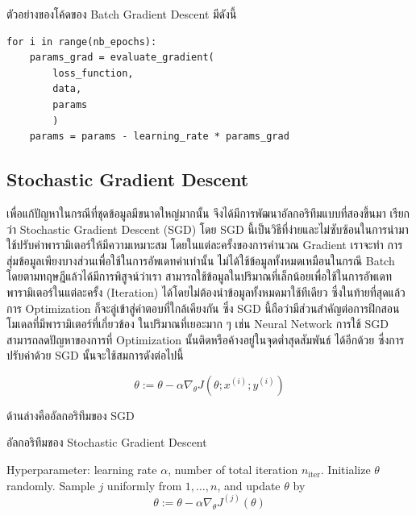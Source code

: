 \noindent ตัวอย่างของโค้ดของ Batch Gradient Descent มีดังนี้

\begin{lstlisting}[style=MyPython]
for i in range(nb_epochs):
    params_grad = evaluate_gradient(
        loss_function, 
        data, 
        params
        )
    params = params - learning_rate * params_grad
\end{lstlisting}

\subsection{Stochastic Gradient Descent}
\label{ssec:stochastic_grad}

เพื่อแก้ปัญหาในกรณีที่ชุดข้อมูลมีขนาดใหญ่มากนั้น จึงได้มีการพัฒนาอัลกอริทึมแบบที่สองขึ้นมา เรียกว่า Stochastic Gradient Descent (SGD)
โดย SGD นี้เป็นวิธีที่ง่ายและไม่ซับซ้อนในการนำมาใช้ปรับค่าพารามิเตอร์ให้มีความเหมาะสม โดยในแต่ละครั้งของการคำนวณ Gradient เราจะทำ%
การสุ่มข้อมูลเพียงบางส่วนเพื่อใช้ในการอัพเดทค่าเท่านั้น ไม่ได้ใช้ข้อมูลทั้งหมดเหมือนในกรณี Batch โดยตามทฤษฎีแล้วได้มีการพิสูจน์ว่าเรา%
สามารถใช้ข้อมูลในปริมาณที่เล็กน้อยเพื่อใช้ในการอัพเดทพารามิเตอร์ในแต่ละครั้ง (Iteration) ได้โดยไม่ต้องนำข้อมูลทั้งหมดมาใช้ทีเดียว
ซึ่งในท้ายที่สุดแล้วการ Optimization ก็จะลู่เข้าสู่คำตอบที่ใกล้เคียงกัน ซึ่ง SGD นี้ถือว่ามีส่วนสำคัญต่อการฝึกสอนโมเดลที่มีพารามิเตอร์ที่เกี่ยวข้อง%
ในปริมาณที่เยอะมาก ๆ เช่น Neural Network การใช้ SGD สามารถลดปัญหาของการที่ Optimization นั้นติดหรือค้างอยู่ในจุดต่ำสุดสัมพันธ์%
ได้อีกด้วย ซึ่งการปรับค่าด้วย SGD นั้นจะใช้สมการดังต่อไปนี้

\begin{equation}\label{eq:sgd}
    \theta := \theta - \alpha\nabla_\theta J( \theta; x^{(i)}; y^{(i)})
\end{equation}

\noindent ด้านล่างคืออัลกอริทึมของ SGD

\begin{algorithm}[H]
    \caption{อัลกอริทึมของ Stochastic Gradient Descent}
    \label{alg:sgd}
    \begin{algorithmic}
        \State Hyperparameter: learning rate $\alpha$, number of total iteration $n_\text{iter}$.
        \State Initialize $\theta$ randomly.
        \State Sample $j$ uniformly from ${1,\ldots,n}$, and update $\theta$ by
        \begin{equation*}
            \theta := \theta - \alpha\nabla_\theta J^{(j)}(\theta)
        \end{equation*}
        \EndFor
    \end{algorithmic}
\end{algorithm}

